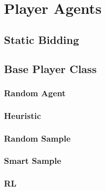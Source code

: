 \chapter{Player Agents}


\section{Static Bidding}


\section{Base Player Class}

\subsection{Random Agent}

\subsection{Heuristic}

\subsection{Random Sample}

\subsection{Smart Sample}

\subsection{RL}